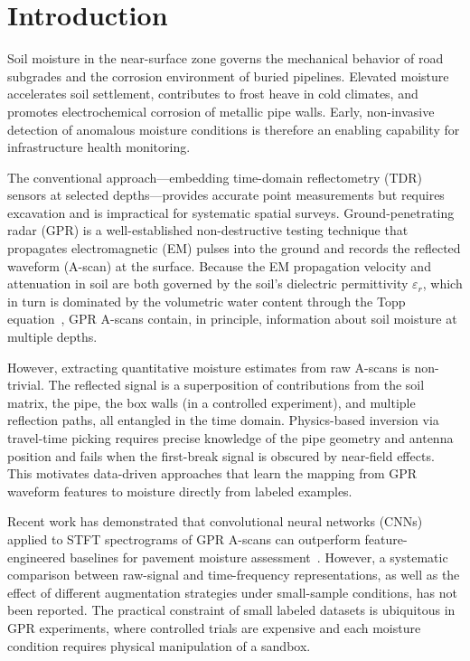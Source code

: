 \documentclass[review]{elsarticle}
\begin{document}
\linenumbers

\section{Introduction}
\label{sec:intro}

Soil moisture in the near-surface zone governs the mechanical behavior of road subgrades and the corrosion environment of buried pipelines. Elevated moisture accelerates soil settlement, contributes to frost heave in cold climates, and promotes electrochemical corrosion of metallic pipe walls. Early, non-invasive detection of anomalous moisture conditions is therefore an enabling capability for infrastructure health monitoring.

The conventional approach---embedding time-domain reflectometry (TDR) sensors at selected depths---provides accurate point measurements but requires excavation and is impractical for systematic spatial surveys. Ground-penetrating radar (GPR) is a well-established non-destructive testing technique that propagates electromagnetic (EM) pulses into the ground and records the reflected waveform (A-scan) at the surface. Because the EM propagation velocity and attenuation in soil are both governed by the soil's dielectric permittivity $\varepsilon_r$, which in turn is dominated by the volumetric water content through the Topp equation~\cite{Topp1980}, GPR A-scans contain, in principle, information about soil moisture at multiple depths.

However, extracting quantitative moisture estimates from raw A-scans is non-trivial. The reflected signal is a superposition of contributions from the soil matrix, the pipe, the box walls (in a controlled experiment), and multiple reflection paths, all entangled in the time domain. Physics-based inversion via travel-time picking requires precise knowledge of the pipe geometry and antenna position and fails when the first-break signal is obscured by near-field effects. This motivates data-driven approaches that learn the mapping from GPR waveform features to moisture directly from labeled examples.

Recent work has demonstrated that convolutional neural networks (CNNs) applied to STFT spectrograms of GPR A-scans can outperform feature-engineered baselines for pavement moisture assessment~\cite{Cao2022}. However, a systematic comparison between raw-signal and time-frequency representations, as well as the effect of different augmentation strategies under small-sample conditions, has not been reported. The practical constraint of small labeled datasets is ubiquitous in GPR experiments, where controlled trials are expensive and each moisture condition requires physical manipulation of a sandbox.
\end{document}
